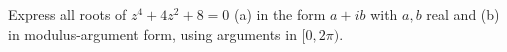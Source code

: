 Express all roots of $z^4+4z^2+8=0$ (a) in the form $a+ib$ with $a,b$ real and (b) in modulus-argument form, using arguments in $[0,2\pi)$.

